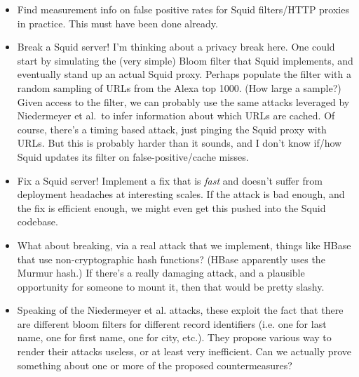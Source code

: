 \begin{itemize}
\item Find measurement info on false positive rates for Squid filters/HTTP proxies in practice.  This must have been done already.

\item Break a Squid server!  I'm thinking about a privacy break here.  One could start by simulating the (very simple) Bloom filter that Squid implements, and eventually stand up an actual Squid proxy.  Perhaps populate the filter with a random sampling of URLs from the Alexa top 1000.  (How large a sample?)  Given access to the filter, we can probably use the same attacks leveraged by Niedermeyer et al.\ to infer information about which URLs are cached.  Of course, there's a timing based attack, just pinging the Squid proxy with URLs.   But this is probably harder than it sounds, and I don't know if/how Squid updates its filter on false-positive/cache misses.  

\item Fix a Squid server!  Implement a fix that is \emph{fast} and doesn't suffer from deployment headaches at interesting scales.  If the attack is bad enough, and the fix is efficient enough, we might even get this pushed into the Squid codebase. 

\item What about breaking, via a real attack that we implement, things like HBase that use non-cryptographic hash functions?  (HBase apparently uses the Murmur hash.)  If there's a really damaging attack, and a plausible opportunity for someone to mount it, then that would be pretty slashy.

\item Speaking of the Niedermeyer et al. attacks, these exploit the fact that there are different bloom filters for different record identifiers (i.e. one for last name, one for first name, one for city, etc.).  They propose various way to render their attacks useless, or at least very inefficient.  Can we actually prove something about one or more of the proposed countermeasures?


\end{itemize}
